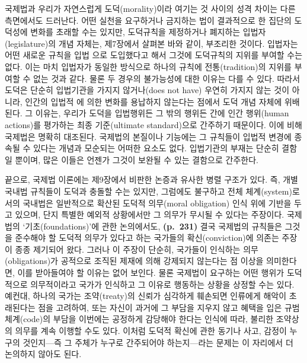 국제법과 우리가 자연스럽게 도덕(morality)이라 여기는 것 사이의 성격
차이는 다른 측면에서도 드러난다. 어떤 실천을 요구하거나 금지하는 법이
결과적으로 한 집단의 도덕성에 변화를 초래할 수는 있지만, 도덕규칙을
제정하거나 폐지하는 입법자(legislature)의 개념 자체는, 제7장에서 살펴본
바와 같이, 부조리한 것이다. 입법자는 어떤 새로운 규칙을 입법
으로 도입했다고 해서 그것에 도덕규칙의 지위를 부여할
수는 없다. 이는 마치 입법자가 동일한 방식으로 하나의 규칙에
전통(tradition)의 지위를 부여할 수 없는 것과 같다. 물론 두 경우의
불가능성에 대한 이유는 다를 수 있다. 따라서 도덕은 단순히 입법기관을
가지지 않거나(does not have) 우연히 가지지 않는 것이 아니라, 인간의
입법적 에 의한 변화를 용납하지 않는다는 점에서 도덕
개념 자체에 위배된다. 그 이유는, 우리가 도덕을 입법행위든 그 밖의 행위든
간에 인간 행위(human actions)를 평가하는 최종 기준(ultimate
standard)으로 간주하기 때문이다. 이에 비해 국제법은 명확히 대조된다.
국제법의 본질이나 기능에는 그 규칙들이 입법적 변경에 종속될 수 있다는
개념과 모순되는 어떠한 요소도 없다. 입법기관의 부재는 단순히 결함일
뿐이며, 많은 이들은 언젠가 그것이 보완될 수 있는 결함으로 간주한다.

끝으로, 국제법 이론에는 제9장에서 비판한 논증과 유사한 병렬 구조가 있다.
즉, 개별 국내법 규칙들이 도덕과 충돌할 수는 있지만, 그럼에도 불구하고
전체 체계(system)로서의 국내법은 일반적으로 확산된 도덕적 의무(moral
obligation) 인식 위에 기반을 두고 있으며, 단지 특별한 예외적 상황에서만
그 의무가 무시될 수 있다는 주장이다. 국제법의 `기초(foundations)'에 관한
논의에서도, \textbf{(p.~231)} 결국 국제법의 규칙들은 그것을 준수해야 할
도덕적 의무가 있다고 하는 국가들의 확신(conviction)에 의존는 주장이 종종 제기되어 왔다. 그러나 이 주장이 단순히,
국가들이 인식하는 의무(obligations)가 공적으로 조직된 제재에 의해
강제되지 않는다는 점 이상을 의미한다면, 이를 받아들여야 할 이유는 없어
보인다. 물론 국제법이 요구하는 어떤 행위가 도덕적으로 의무적이라고
국가가 인식하고 그 이유로 행동하는 상황을 상정할 수는 있다. 예컨대,
하나의 국가는 조약(treaty)의 신뢰가 심각하게 훼손되면 인류에게 해악이
초래된다는 점을 고려하여, 또는 자신이 과거에 그 부담을 지우지 않고
혜택을 입은 규범체계(code)의 부담을 이번에는 공정하게 감당해야 한다는
인식에 따라, 불리한 조약상의 의무를 계속 이행할 수도 있다. 이처럼 도덕적
확신에 관한 동기나 사고, 감정이 누구의 것인지---즉 그 주체가 누구로
간주되어야 하는지---라는 문제는 이 자리에서 더 논의하지 않아도 된다.

